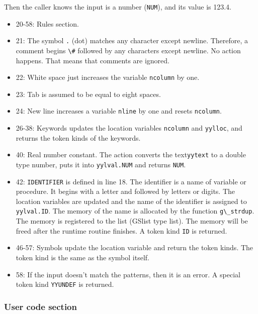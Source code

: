 Then the caller knows the input is a number
(\passthrough{\lstinline!NUM!}), and its value is 123.4.

\begin{itemize}
\tightlist
\item
  20-58: Rules section.
\item
  21: The symbol \passthrough{\lstinline!.!} (dot) matches any character
  except newline. Therefore, a comment begins
  \passthrough{\lstinline!\#!} followed by any characters except
  newline. No action happens. That means that comments are ignored.
\item
  22: White space just increases the variable
  \passthrough{\lstinline!ncolumn!} by one.
\item
  23: Tab is assumed to be equal to eight spaces.
\item
  24: New line increases a variable \passthrough{\lstinline!nline!} by
  one and resets \passthrough{\lstinline!ncolumn!}.
\item
  26-38: Keywords updates the location variables
  \passthrough{\lstinline!ncolumn!} and
  \passthrough{\lstinline!yylloc!}, and returns the token kinds of the
  keywords.
\item
  40: Real number constant. The action converts the
  text\passthrough{\lstinline!yytext!} to a double type number, puts it
  into \passthrough{\lstinline!yylval.NUM!} and returns
  \passthrough{\lstinline!NUM!}.
\item
  42: \passthrough{\lstinline!IDENTIFIER!} is defined in line 18. The
  identifier is a name of variable or procedure. It begins with a letter
  and followed by letters or digits. The location variables are updated
  and the name of the identifier is assigned to
  \passthrough{\lstinline!yylval.ID!}. The memory of the name is
  allocated by the function \passthrough{\lstinline!g\_strdup!}. The
  memory is registered to the list (GSlist type list). The memory will
  be freed after the runtime routine finishes. A token kind
  \passthrough{\lstinline!ID!} is returned.
\item
  46-57: Symbols update the location variable and return the token
  kinds. The token kind is the same as the symbol itself.
\item
  58: If the input doesn't match the patterns, then it is an error. A
  special token kind \passthrough{\lstinline!YYUNDEF!} is returned.
\end{itemize}

\subsubsection{User code section}\label{user-code-section}

